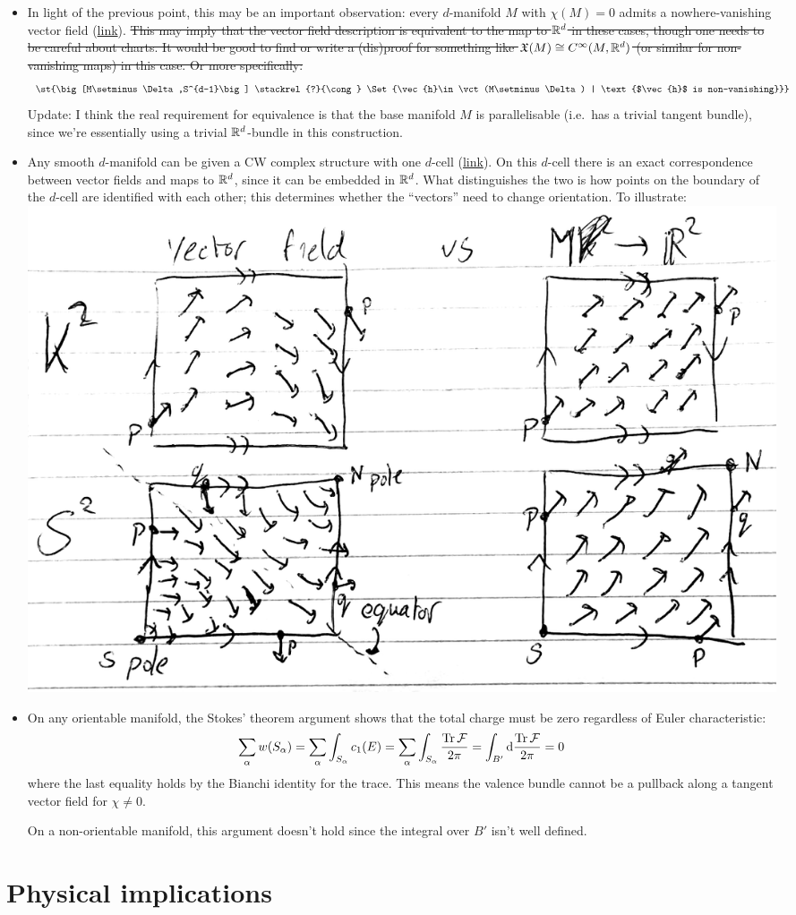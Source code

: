 {\begin{itemize}
	\item In light of the previous point, this may be an important observation: every $d$-manifold $M$ with $\chi(M)=0$ admits a nowhere-vanishing vector field (\href{https://math.stackexchange.com/questions/47370/if-a-manifold-m-has-zero-euler-characteristic-there-is-a-non-vanishing-vector-f}{link}). \st{This may imply that the vector field description is equivalent to the map to $\mathbb{R}^d$ in these cases, though one needs to be careful about charts. It would be good to find or write a (dis)proof for something like $\mathfrak{X}(M)\cong C^\infty(M,\mathbb{R}^d)$ (or similar for non-vanishing maps) in this case. Or more specifically:}
	\[
		\st{\big[M\setminus\Delta,S^{d-1}\big] \stackrel{?}{\cong} \Set{\vec{h}\in\vct(M\setminus\Delta) | \text{$\vec{h}$ is non-vanishing}}}
	\]
	Update: I think the real requirement for equivalence is that the base manifold $M$ is parallelisable (i.e.\ has a trivial tangent bundle), since we're essentially using a trivial $\mathbb{R}^d$-bundle in this construction.
	
	\item Any smooth $d$-manifold can be given a CW complex structure with one $d$-cell (\href{https://mathoverflow.net/questions/120799/manifolds-admitting-cw-structure-with-single-n-cell}{link}). On this $d$-cell there is an exact correspondence between vector fields and maps to $\mathbb{R}^d$, since it can be embedded in $\mathbb{R}^d$. What distinguishes the two is how points on the boundary of the $d$-cell are identified with each other; this determines whether the ``vectors'' need to change orientation. To illustrate:
	\includegraphics[width=.9\textwidth]{Images/vectorfield-vs-map}
	
	\item On any orientable manifold, the Stokes' theorem argument shows that the total charge must be zero regardless of Euler characteristic:
	\[
		\sum_{\alpha}w(S_\alpha) = \sum_{\alpha}\int_{S_\alpha} c_1(E) = \sum_{\alpha}\int_{S_\alpha}\frac{\Tr\mathcal{F}}{2\pi} = \int_{B'} \dd{\frac{\Tr\mathcal{F}}{2\pi}} = 0
	\]
	where the last equality holds by the Bianchi identity for the trace. This means the valence bundle cannot be a pullback along a tangent vector field for $\chi\neq0$.
	
	On a non-orientable manifold, this argument doesn't hold since the integral over $B'$ isn't well defined.
\end{itemize}
}  %

\section{Physical implications}